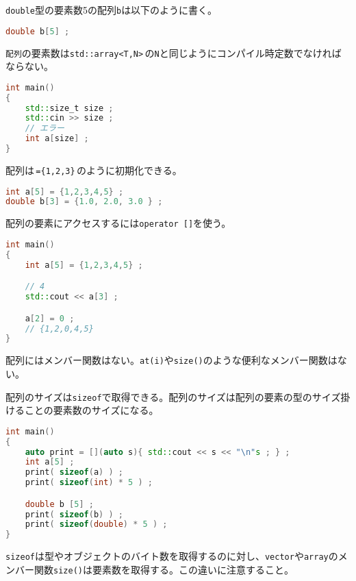 \texttt{double}型の要素数5の配列\texttt{b}は以下のように書く。

\begin{lstlisting}[language={C++}]
double b[5] ;
\end{lstlisting}

\texttt{配列}の要素数は\texttt{std::array<T,N>}\,の\texttt{N}と同じようにコンパイル時定数でなければならない。

\begin{lstlisting}[language={C++}]
int main()
{
    std::size_t size ;
    std::cin >> size ;
    // エラー
    int a[size] ;
}
\end{lstlisting}

配列は\,\texttt{=\{1,2,3\}}\,のように初期化できる。

\begin{lstlisting}[language={C++}]
int a[5] = {1,2,3,4,5} ;
double b[3] = {1.0, 2.0, 3.0 } ;
\end{lstlisting}

配列の要素にアクセスするには\texttt{operator []}を使う。

\begin{lstlisting}[language={C++}]
int main()
{
    int a[5] = {1,2,3,4,5} ;

    // 4
    std::cout << a[3] ;

    a[2] = 0 ;
    // {1,2,0,4,5}
}
\end{lstlisting}

配列にはメンバー関数はない。\texttt{at(i)}や\texttt{size()}のような便利なメンバー関数はない。

配列のサイズは\texttt{sizeof}で取得できる。配列のサイズは配列の要素の型のサイズ掛けることの要素数のサイズになる。

\begin{lstlisting}[language={C++}]
int main()
{
    auto print = [](auto s){ std::cout << s << "\n"s ; } ;
    int a[5] ;
    print( sizeof(a) ) ;
    print( sizeof(int) * 5 ) ;

    double b [5] ;
    print( sizeof(b) ) ;
    print( sizeof(double) * 5 ) ;
}
\end{lstlisting}

\texttt{sizeof}は型やオブジェクトのバイト数を取得するのに対し、\texttt{vector}や\texttt{array}のメンバー関数\texttt{size()}は要素数を取得する。この違いに注意すること。


